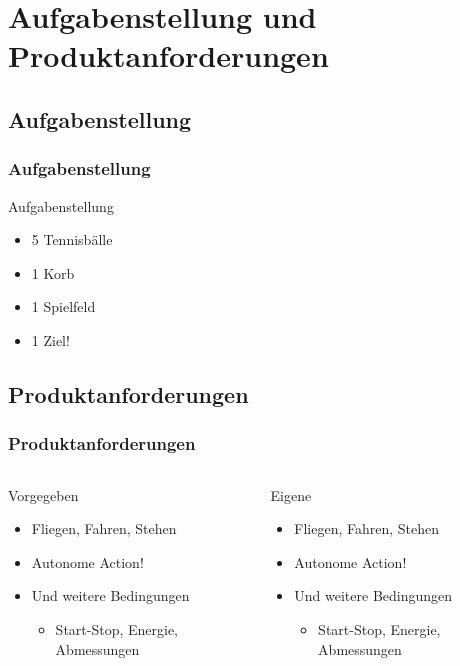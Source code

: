 \section{Aufgabenstellung und Produktanforderungen} %
\subsection{Aufgabenstellung}
\begin{frame}
    \frametitle{Aufgabenstellung}
	\begin{block}{Aufgabenstellung}
	    \begin{itemize}
	    	\item 5 Tennisbälle
	    	\item 1 Korb
		    \item 1 Spielfeld
		    \item 1 Ziel!
	    \end{itemize}
    \end{block}
\end{frame}
\subsection{Produktanforderungen}
\begin{frame}
    \frametitle{Produktanforderungen}
    \begin{columns}
        \begin{column}{0.5\textwidth}
            \begin{block}{Vorgegeben}
                 \begin{itemize}
                    \item Fliegen, Fahren, Stehen
                    \item Autonome Action!
                    \item Und weitere Bedingungen
                    \begin{itemize}
                        \item Start-Stop, Energie, Abmessungen
                    \end{itemize}
                 \end{itemize}
            \end{block}
        \end{column}
        \begin{column}{0.5\textwidth}
            \begin{block}{Eigene}
                 \begin{itemize}
                    \item Fliegen, Fahren, Stehen
                    \item Autonome Action!
                    \item Und weitere Bedingungen
                    \begin{itemize}
                        \item Start-Stop, Energie, Abmessungen
                    \end{itemize}
                 \end{itemize}
            \end{block}
        \end{column}
    \end{columns}
\end{frame}
